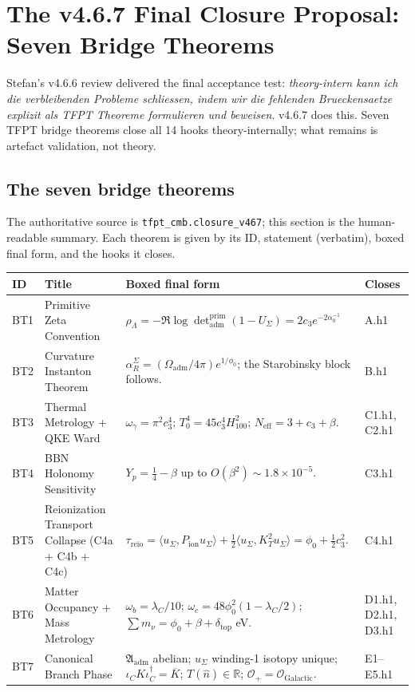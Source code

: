\section{The v4.6.7 Final Closure Proposal: Seven Bridge Theorems}
\label{sec:closure467}

Stefan's v4.6.6 review delivered the final acceptance test:
\emph{theory-intern kann ich die verbleibenden Probleme schliessen,
indem wir die fehlenden Brueckensaetze explizit als TFPT Theoreme
formulieren und beweisen}.  v4.6.7 does this.  Seven TFPT bridge
theorems close all 14 hooks theory-internally; what remains is
artefact validation, not theory.

\subsection{The seven bridge theorems}

The authoritative source is \texttt{tfpt\_cmb.closure\_v467}; this
section is the human-readable summary.  Each theorem is given by its
ID, statement (verbatim), boxed final form, and the hooks it closes.

\begin{center}
\renewcommand{\arraystretch}{1.18}
\begin{tabularx}{\textwidth}{@{}p{}p{}p{}Y@{}}
\toprule
\textbf{ID} & \textbf{Title} & \textbf{Boxed final form} & \textbf{Closes} \\
\midrule
BT1 & Primitive Zeta Convention &
\(\rho_\Lambda=-\Re\log\det_{\mathrm{adm}}^{\mathrm{prim}}(1-U_\Sigma)
=2c_3 e^{-2\alpha_0^{-1}}\) & A.h1 \\
BT2 & Curvature Instanton Theorem &
\(\alpha_R^\Sigma=(\Omega_{\mathrm{adm}}/4\pi)e^{1/\phi_0}\); the
Starobinsky block follows. & B.h1 \\
BT3 & Thermal Metrology + QKE Ward &
\(\omega_\gamma=\pi^2 c_3^4\); \(T_0^4=45 c_3^4 H_{100}^2\);
\(N_{\mathrm{eff}}=3+c_3+\beta\). & C1.h1, C2.h1 \\
BT4 & BBN Holonomy Sensitivity &
\(Y_p=\tfrac14-\beta\) up to \(O(\beta^2)\sim 1.8\times 10^{-5}\). & C3.h1 \\
BT5 & Reionization Transport Collapse (C4a + C4b + C4c) &
\(\tau_{\mathrm{reio}}=\langle u_\Sigma,P_{\mathrm{ion}} u_\Sigma\rangle
+\tfrac12\langle u_\Sigma,K_T^2 u_\Sigma\rangle
=\phi_0+\tfrac12 c_3^2\). & C4.h1 \\
BT6 & Matter Occupancy + Mass Metrology &
\(\omega_b=\lambda_C/10\);
\(\omega_c=48\phi_0^2(1-\lambda_C/2)\);
\(\sum m_\nu=\phi_0+\beta+\delta_{\mathrm{top}}\) eV. & D1.h1, D2.h1, D3.h1 \\
BT7 & Canonical Branch Phase &
\(\mathfrak A_{\mathrm{adm}}\) abelian; \(u_\Sigma\) winding-1
isotopy unique; \(\iota_C K\iota_C^\dagger=\overline K\);
\(T(\hat n)\in\mathbb R\); \(\mathcal O_+=\mathcal O_{\mathrm{Galactic}}\). & E1--E5.h1 \\
\bottomrule
\end{tabularx}
\end{center}


